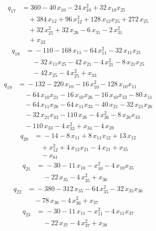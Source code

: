 \begin{align*}
q_{17} &={}360 -40\,x_{10} -24\,x_{10}^{2} +32\,x_{10}x_{25}\\
&\quad +384\,x_{12} +96\,x_{12}^{2} +128\,x_{12}x_{25} +272\,x_{25}\\
&\quad +32\,x_{25}^{2} +32\,x_{26} -6\,x_{31} -2\,x_{31}^{2}\\
&\quad +x_{32}
\end{align*}
\begin{align*}
q_{18} &={}-110 -168\,x_{11} -64\,x_{11}^{2} -32\,x_{11}x_{21}\\
&\quad -32\,x_{11}x_{25} -42\,x_{21} -4\,x_{21}^{2} -8\,x_{21}x_{25}\\
&\quad -42\,x_{25} -4\,x_{25}^{2} +x_{33}
\end{align*}
\begin{align*}
q_{19} &={}-132 -220\,x_{10} -16\,x_{10}^{2} -128\,x_{10}x_{11}\\
&\quad -64\,x_{10}x_{21} -16\,x_{10}x_{26} -16\,x_{10}x_{33} -80\,x_{11}\\
&\quad -64\,x_{11}x_{26} -64\,x_{11}x_{33} -40\,x_{21} -32\,x_{21}x_{26}\\
&\quad -32\,x_{21}x_{33} -110\,x_{26} -4\,x_{26}^{2} -8\,x_{26}x_{33}\\
&\quad -110\,x_{33} -4\,x_{33}^{2} +x_{34} -4\,x_{39}
\end{align*}
\begin{align*}
q_{20} &={}-14 -8\,x_{11} +8\,x_{11}x_{12} +13\,x_{12}\\
&\quad +x_{12}^{2} +4\,x_{12}x_{21} -4\,x_{21} +x_{35}\\
&\quad -x_{61}
\end{align*}
\begin{align*}
q_{21} &={}-30 -11\,x_{10} -x_{10}^{2} -4\,x_{10}x_{35}\\
&\quad -22\,x_{35} -4\,x_{35}^{2} +x_{36}
\end{align*}
\begin{align*}
q_{22} &={}-380 -312\,x_{35} -64\,x_{35}^{2} -32\,x_{35}x_{36}\\
&\quad -78\,x_{36} -4\,x_{36}^{2} +x_{37}
\end{align*}
\begin{align*}
q_{23} &={}-30 -11\,x_{11} -x_{11}^{2} -4\,x_{11}x_{37}\\
&\quad -22\,x_{37} -4\,x_{37}^{2} +x_{38}
\end{align*}
